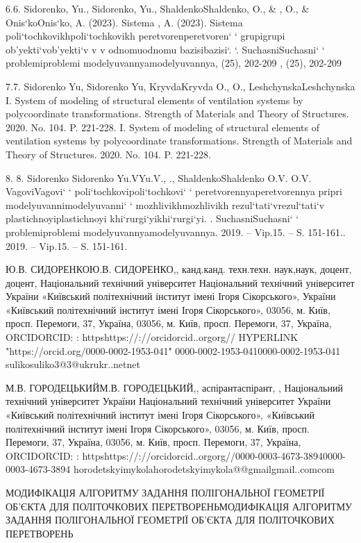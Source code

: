 \documentclass[12pt,a4paper]{article}
\begin{document}
\par
6.6.	Sidorenko, Yu., Sidorenko, Yu., ShaldenkoShaldenko, O., \& , O., \& Onis`koOnis`ko, A. (2023). Sistema , A. (2023). Sistema poli`tochkovikhpoli`tochkovikh  peretvorenperetvoren` ` grupigrupi  ob'yekti`vob'yekti`v v  v odnomuodnomu  bazisibazisi`. `. SuchasniSuchasni` ` problemiproblemi  modelyuvannyamodelyuvannya, (25), 202-209  , (25), 202-209
\par
7.7.	Sidorenko Yu, Sidorenko Yu, KryvdaKryvda O.,  O., LeshchynskaLeshchynska I. System of modeling of structural elements of ventilation systems by polycoordinate transformations. Strength of Materials and Theory of Structures. 2020. No. 104. P. 221-228.  I. System of modeling of structural elements of ventilation systems by polycoordinate transformations. Strength of Materials and Theory of Structures. 2020. No. 104. P. 221-228.
\par
8. 8. Sidorenko Sidorenko Yu.VYu.V., ., ShaldenkoShaldenko O.V.  O.V. VagoviVagovi` ` poli`tochkovipoli`tochkovi` ` peretvorennyaperetvorennya  pripri  modelyuvannimodelyuvanni` ` mozhlivikhmozhlivikh  rezul`tati`vrezul`tati`v  plastichnoyiplastichnoyi  khi`rurgi`yikhi`rurgi`yi. . SuchasniSuchasni` ` problemiproblemi  modelyuvannyamodelyuvannya. 2019. – Vip.15. – S. 151-161.. 2019. – Vip.15. – S. 151-161.
\par
Ю.В. СИДОРЕНКОЮ.В. СИДОРЕНКО,,  канд.канд.  техн.техн.  наук,наук, доцент,  доцент, Національний технічний університет Національний технічний університет 
України «Київський політехнічний інститут імені Ігоря Сікорського», України «Київський політехнічний інститут імені Ігоря Сікорського», 
03056, м. Київ, просп. Перемоги, 37, Україна, 03056, м. Київ, просп. Перемоги, 37, Україна, ORCIDORCID: : httpshttps://://orcidorcid..orgorg// HYPERLINK "https://orcid.org/0000-0002-1953-041" 0000-0002-1953-0410000-0002-1953-041      
sulikosuliko3@3@ukrukr..netnet
\par
М.В. ГОРОДЕЦЬКИЙМ.В. ГОРОДЕЦЬКИЙ,,  аспірантаспірант, , Національний технічний університет України Національний технічний університет України 
«Київський політехнічний інститут імені Ігоря Сікорського», «Київський політехнічний інститут імені Ігоря Сікорського», 
03056, м. Київ, просп. Перемоги, 37, Україна, 03056, м. Київ, просп. Перемоги, 37, Україна, ORCIDORCID: : httpshttps://://orcidorcid..orgorg//0000-0003-4673-38940000-0003-4673-3894
horodetskyimykolahorodetskyimykola@@gmailgmail..comcom
\par
МОДИФІКАЦІЯ АЛГОРИТМУ ЗАДАННЯ ПОЛІГОНАЛЬНОЇ ГЕОМЕТРІЇ ОБ’ЄКТА ДЛЯ ПОЛІТОЧКОВИХ ПЕРЕТВОРЕНЬМОДИФІКАЦІЯ АЛГОРИТМУ ЗАДАННЯ ПОЛІГОНАЛЬНОЇ ГЕОМЕТРІЇ ОБ’ЄКТА ДЛЯ ПОЛІТОЧКОВИХ ПЕРЕТВОРЕНЬ
\end{document}
